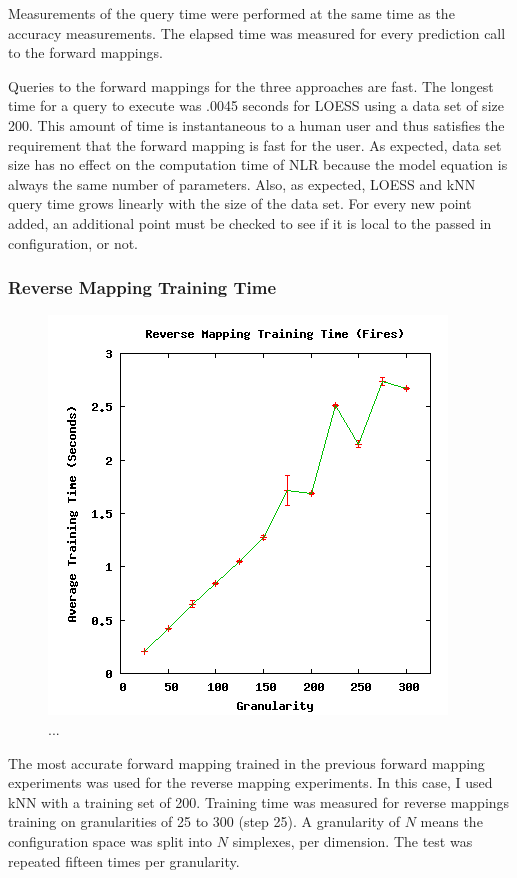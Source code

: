 Measurements of the query time were performed at the same time as the accuracy measurements.
The elapsed time was measured for every prediction call to the forward mappings.

Queries to the forward mappings for the three approaches are fast.
The longest time for a query to execute was .0045 seconds for LOESS using a data set of size 200.
This amount of time is instantaneous to a human user and thus satisfies the requirement that the forward mapping is fast for the user.
As expected, data set size has no effect on the computation time of NLR because the model equation is always the same number of parameters.
Also, as expected, LOESS and kNN query time grows linearly with the size of the data set.
For every new point added, an additional point must be checked to see if it is local to the passed in configuration, or not.


\subsubsection{Reverse Mapping Training Time}

\begin{figure}[ht]
\centering
\includegraphics[scale=.5]{images/results_fires/rmtraining.png}
\caption{...}
\label{fig:rmtraining}
\end{figure}

The most accurate forward mapping trained in the previous forward mapping experiments was used for the reverse mapping experiments.
In this case, I used kNN with a training set of 200.
Training time was measured for reverse mappings training on granularities of 25 to 300 (step 25).
A granularity of $N$ means the configuration space was split into $N$ simplexes, per dimension.
The test was repeated fifteen times per granularity.

